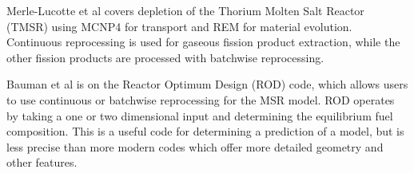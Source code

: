 Merle-Lucotte et al \cite{merle-lucotte_thorium_2007} covers depletion of the Thorium Molten Salt Reactor (TMSR) using MCNP4 \cite{goluoglu_software_1998} for transport and REM for material evolution. Continuous reprocessing is used for gaseous fission product extraction, while the other fission products are processed with batchwise reprocessing.

Bauman et al \cite{h_f_bauman_rod_1971} is on the Reactor Optimum Design (ROD) code, which allows users to use continuous or batchwise reprocessing for the MSR model. ROD operates by taking a one or two dimensional input and determining the equilibrium fuel composition. This is a useful code for determining a prediction of a model, but is less precise than more modern codes which offer more detailed geometry and other features.





